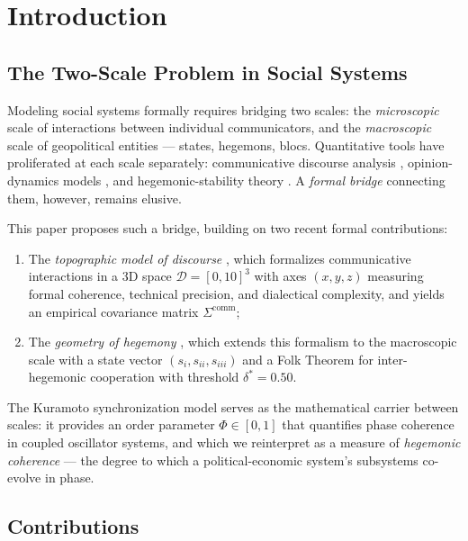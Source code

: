 \documentclass[12pt]{article}
\theoremstyle{plain}
\theoremstyle{definition}
\theoremstyle{remark}
\providecommand{\tightlist}{\setlength{\itemsep}{0pt}\setlength{\parskip}{0pt}}
\begin{document}
\clearpage

\section{Introduction}

\subsection{The Two-Scale Problem in Social Systems}

Modeling social systems formally requires bridging two scales: the \emph{microscopic} scale of interactions between individual communicators, and the \emph{macroscopic} scale of geopolitical entities --- states, hegemons, blocs. Quantitative tools have proliferated at each scale separately: communicative discourse analysis \citep{habermas1984,vandijk1993}, opinion-dynamics models \citep{castellano2009}, and hegemonic-stability theory \citep{gilpin1981,cox1987,arrighi1994}. A \emph{formal bridge} connecting them, however, remains elusive.

This paper proposes such a bridge, building on two recent formal contributions:

\begin{enumerate}\tightlist
\item The \emph{topographic model of discourse} \citep{marcelino2026a}, which formalizes communicative interactions in a 3D space $\mathcal{D} = [0,10]^3$ with axes $(x, y, z)$ measuring formal coherence, technical precision, and dialectical complexity, and yields an empirical covariance matrix $\Sigma^{\text{comm}}$;
\item The \emph{geometry of hegemony} \citep{marcelino2026b}, which extends this formalism to the macroscopic scale with a state vector $(s_i, s_{ii}, s_{iii})$ and a Folk Theorem for inter-hegemonic cooperation with threshold $\delta^* = 0.50$.
\end{enumerate}

The Kuramoto synchronization model \citep{kuramoto1984} serves as the mathematical carrier between scales: it provides an order parameter $\Phi \in [0,1]$ that quantifies phase coherence in coupled oscillator systems, and which we reinterpret as a measure of \emph{hegemonic coherence} --- the degree to which a political-economic system's subsystems co-evolve in phase.

\subsection{Contributions}
\end{document}

